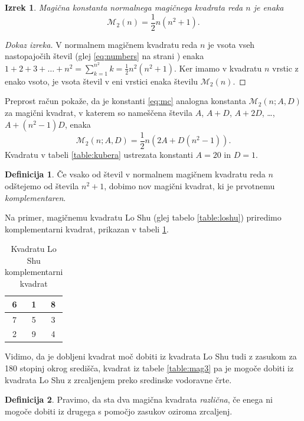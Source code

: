 \documentclass[a4paper,12pt]{article}
\newcommand{\m}{\mathcal{M}_2}
\newcommand{\pojem}[1]{\emph{\color{purple}#1}}
\theoremstyle{definition}
\newtheorem{definicija}{Definicija}
\theoremstyle{plain}
\newtheorem{izrek}{Izrek}
\newenvironment{magic}[3]
{
    \begin{table}[!ht]
    \centering
    \caption{#2}
    \label{#3}
    \large
    \begin{tabular}{|*{#1}{c|}}
    \hline
}
{
    \end{tabular}
    \normalsize
    \end{table}
}
\begin{document}
\begin{izrek}
   Magična konstanta normalnega magičnega kvadrata reda \(n\)
   je enaka
   \begin{equation}
      \label{eq:mc}
      \m(n) = \frac{1}{2} n(n^2+1).
   \end{equation}
\end{izrek}

\begin{proof}[Dokaz izreka]
   V normalnem magičnem kvadratu reda \(n\) je vsota vseh nastopajočih
   števil (glej \eqref{eq:numbers} na strani \pageref{eq:numbers}) enaka
   \(1+2+3+\ldots+n^2=\sum_{k=1}^{n^2}k=\frac{1}{2}n^2(n^2+1)\). Ker imamo
   v kvadratu \(n\) vrstic z enako vsoto, je vsota števil v eni vrstici
   enaka številu \(\m(n)\).
\end{proof}

Preprost račun pokaže, da je konstanti \eqref{eq:mc} analogna konstanta
\(\m(n;A,D)\) za magični kvadrat, v katerem so nameščena števila
\(A\), \(A+D\), \(A+2D\), \ldots, \(A+(n^2-1)D\), enaka
\[
   \m(n;A,D) = \frac{1}{2} n \left(2A+D(n^2-1)\right).
\]
Kvadratu v tabeli \ref{table:kubera} ustrezata konstanti \(A=20\) in \(D=1\). %

\begin{definicija}
   Če vsako od števil v normalnem magičnem kvadratu reda \(n\) odštejemo
   od števila \(n^2+1\), dobimo nov magični kvadrat, ki je prvotnemu
   \pojem{komplementaren}.
\end{definicija}

Na primer, magičnemu kvadratu Lo Shu (glej tabelo \ref{table:loshu}) priredimo
komplementarni kvadrat, prikazan v tabeli \ref{table:closhu}. %
%

\begin{magic}{3}{Kvadratu Lo Shu komplementarni kvadrat}{table:closhu}
6 & 1 & 8 \\ \hline
7 & 5 & 3 \\ \hline
2 & 9 & 4 \\ \hline
\end{magic}
  

Vidimo, da je dobljeni kvadrat moč dobiti iz kvadrata Lo Shu tudi z zasukom za
180 stopinj okrog središča, kvadrat iz tabele \ref{table:mag3} pa je mogoče dobiti
iz kvadrata Lo Shu z zrcaljenjem preko sredinske vodoravne črte. %

\begin{definicija}
   Pravimo, da sta dva magična kvadrata \pojem{različna}, če enega ni mogoče dobiti
   iz drugega s pomočjo zasukov oziroma zrcaljenj.
\end{definicija}
\end{document}
